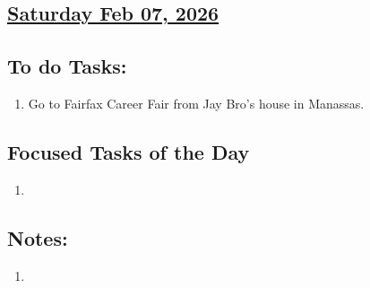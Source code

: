 \subsection*{\underline{Saturday Feb 07, 2026} }
\subsection*{To do Tasks:}
\begin{enumerate}
    \item Go to Fairfax Career Fair from Jay Bro's house in Manassas.
\end{enumerate}
\subsection*{Focused Tasks of the Day}
\begin{enumerate}[\ding{52}]  %
    \item 
\end{enumerate}
\subsection*{Notes:}
\begin{enumerate}
    \item 
\end{enumerate}
\stardivider
